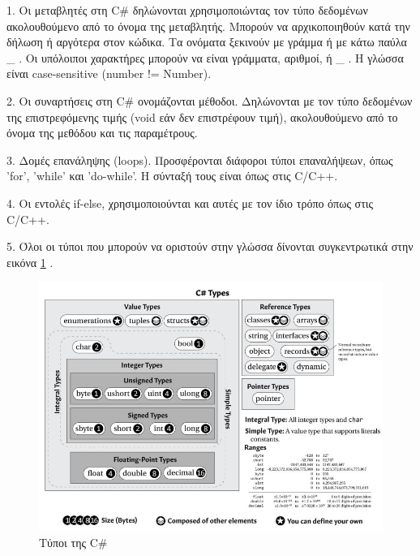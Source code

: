 1. Οι μεταβλητές στη C\# δηλώνονται χρησιμοποιώντας τον τύπο δεδομένων ακολουθούμενο από το όνομα της μεταβλητής. Μπορούν να αρχικοποιηθούν κατά την δήλωση ή αργότερα στον κώδικα. Τα ονόματα ξεκινούν με γράμμα ή με κάτω παύλα \_ . Οι υπόλοιποι χαρακτήρες μπορούν να είναι γράμματα, αριθμοί, ή \_ . Η γλώσσα είναι case-sensitive (number != Number). 



2. Οι συναρτήσεις στη C\# ονομάζονται μέθοδοι. Δηλώνονται με τον τύπο δεδομένων της επιστρεφόμενης τιμής (void εάν δεν επιστρέφουν τιμή), ακολουθούμενο από το όνομα της μεθόδου και τις παραμέτρους.



3. Δομές επανάληψης (loops). Προσφέρονται διάφοροι τύποι επαναλήψεων, όπως 'for', 'while' και 'do-while'. Η σύνταξή τους είναι όπως στις C/C++.



4. Οι εντολές if-else, χρησιμοποιούνται και αυτές με τον ίδιο τρόπο όπως στις C/C++.



5. Όλοι οι τύποι που μπορούν να οριστούν στην γλώσσα δίνονται συγκεντρωτικά στην εικόνα \ref{fig:types} \cite{typesbook}.

\begin{figure}[h!]
  \includegraphics[width=\fullwidthimage]{images/csharptypes.jpg}
  \caption{Τύποι της C\#}
  \label{fig:types}
\end{figure}


